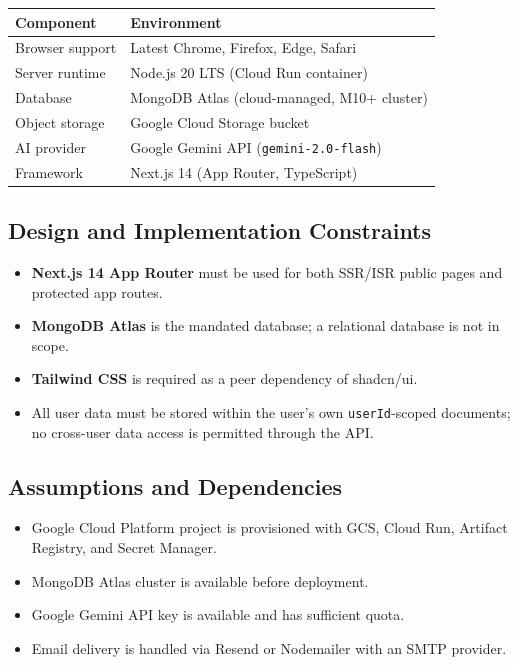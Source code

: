 \documentclass[12pt, a4paper]{article}
\begin{document}
\begin{longtable}{@{}L{3.8cm} L{9cm}@{}}
  \toprule
  \textbf{Component} & \textbf{Environment} \\
  \midrule\endhead
  \bottomrule\endfoot
  Browser support  & Latest Chrome, Firefox, Edge, Safari \\
  Server runtime   & Node.js 20 LTS (Cloud Run container) \\
  Database         & MongoDB Atlas (cloud-managed, M10+ cluster) \\
  Object storage   & Google Cloud Storage bucket \\
  AI provider      & Google Gemini API (\texttt{gemini-2.0-flash}) \\
  Framework        & Next.js 14 (App Router, TypeScript) \\
\end{longtable}

\subsection{Design and Implementation Constraints}

\begin{itemize}[leftmargin=2em]
  \item \textbf{Next.js 14 App Router} must be used for both SSR/ISR public
        pages and protected app routes.
  \item \textbf{MongoDB Atlas} is the mandated database; a relational database
        is not in scope.
  \item \textbf{Tailwind CSS} is required as a peer dependency of shadcn/ui.
  \item All user data must be stored within the user's own
        \texttt{userId}-scoped documents; no cross-user data access is
        permitted through the API.
\end{itemize}

\subsection{Assumptions and Dependencies}

\begin{itemize}[leftmargin=2em]
  \item Google Cloud Platform project is provisioned with GCS, Cloud Run,
        Artifact Registry, and Secret Manager.
  \item MongoDB Atlas cluster is available before deployment.
  \item Google Gemini API key is available and has sufficient quota.
  \item Email delivery is handled via Resend or Nodemailer with an SMTP
        provider.
\end{itemize}
\end{document}
